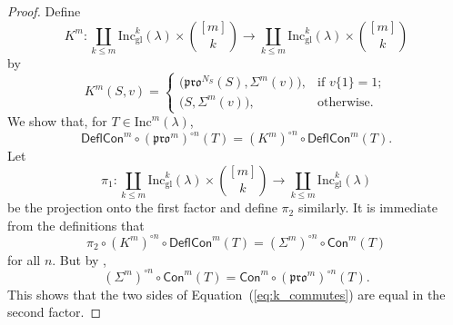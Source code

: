 \documentclass[12pt]{amsart}
\theoremstyle{definition}
\theoremstyle{remark}
\numberwithin{equation}{section}
\newcommand{\inc}{\ensuremath{\mathrm{Inc}}}
\newcommand{\incgl}{\inc_{\mathrm{gl}}}
\newcommand{\pro}{\mathfrak{pro}}
\newcommand{\content}{\ensuremath{\mathsf{Con}}}
\newcommand{\compress}{\ensuremath{\mathsf{DeflCon}}}
\begin{document}
  \begin{proof}
Define
  \[
  K^m: \coprod_{k \leq m}\incgl^k(\lambda) \times \binom{[m]}{k} \rightarrow \coprod_{k \leq m}\incgl^k(\lambda) \times \binom{[m]}{k}
  \] by
\[
K^m(S,v) =
\begin{cases}
    \big( \pro^{N_S}(S),\Sigma^m(v) \big),  & \text{if } v\{1\} = 1; \\        
   \big( S,\Sigma^m(v) \big), & \text{otherwise.}
\end{cases}
\]
We show that, for $T \in \inc^m(\lambda)$,
\begin{equation}\label{eq:k_commutes}
\compress^m \circ (\pro^m)^{\circ n}(T) = (K^m)^{\circ n} \circ \compress^m(T).
\end{equation}
Let \[ \pi_1: \coprod_{k \leq m}\incgl^k(\lambda) \times \binom{[m]}{k} \rightarrow \coprod_{k \leq m} \incgl^k(\lambda) \] be the projection onto the first factor and define $\pi_2$ similarly. It is immediate from the definitions that \[ \pi_2 \circ (K^m)^{\circ n} \circ \compress^m(T) = (\Sigma^m)^{\circ n} \circ \content^m(T)\] for all $n$. But by \cite[Lemma~2.1]{DPS},
\[  (\Sigma^m)^{\circ n} \circ \content^m(T) = \content^m \circ (\pro^m)^{\circ n} (T).\] This shows that the two sides of Equation~(\ref{eq:k_commutes}) are equal in the second factor.  


\end{proof}
\end{document}
